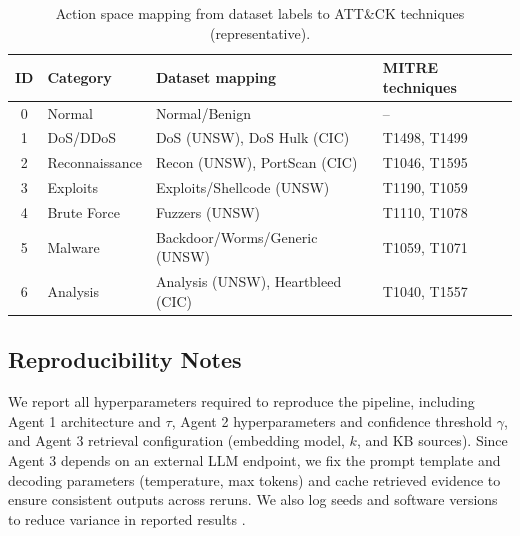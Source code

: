 \begin{table}[t]
\caption{Action space mapping from dataset labels to ATT\&CK techniques (representative).}
\label{tab:action_space}
\centering
\begin{tabular}{clll}
\toprule
\textbf{ID} & \textbf{Category} & \textbf{Dataset mapping} & \textbf{MITRE techniques}\\
\midrule
0 & Normal & Normal/Benign & --\\
1 & DoS/DDoS & DoS (UNSW), DoS Hulk (CIC) & T1498, T1499\\
2 & Reconnaissance & Recon (UNSW), PortScan (CIC) & T1046, T1595\\
3 & Exploits & Exploits/Shellcode (UNSW) & T1190, T1059\\
4 & Brute Force & Fuzzers (UNSW) & T1110, T1078\\
5 & Malware & Backdoor/Worms/Generic (UNSW) & T1059, T1071\\
6 & Analysis & Analysis (UNSW), Heartbleed (CIC) & T1040, T1557\\
\bottomrule
\end{tabular}
\end{table}

\subsection{Reproducibility Notes}
\label{sec:reproducibility_notes}

We report all hyperparameters required to reproduce the pipeline, including Agent 1 architecture and $\tau$, Agent 2 hyperparameters and confidence threshold $\gamma$, and Agent 3 retrieval configuration (embedding model, $k$, and KB sources). Since Agent 3 depends on an external LLM endpoint, we fix the prompt template and decoding parameters (temperature, max tokens) and cache retrieved evidence to ensure consistent outputs across reruns. We also log seeds and software versions to reduce variance in reported results \cite{Dodge2019Reporting}.

